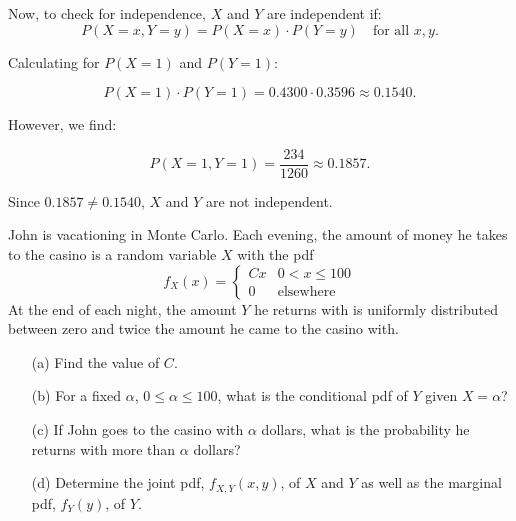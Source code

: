 \begin{solution}
Now, to check for independence, \(X\) and \(Y\) are independent if:
\[
P(X = x, Y = y) = P(X = x) \cdot P(Y = y) \quad \text{for all } x, y.
\]

Calculating for \(P(X = 1)\) and \(P(Y = 1)\):

\[
P(X = 1) \cdot P(Y = 1) = 0.4300 \cdot 0.3596 \approx 0.1540.
\]

However, we find:

\[
P(X = 1, Y = 1) = \frac{234}{1260} \approx 0.1857.
\]

Since \(0.1857 \neq 0.1540\), \(X\) and \(Y\) are not independent.

\end{solution}

\begin{exercise}
John is vacationing in Monte Carlo. Each evening, the amount of money he takes to the casino is a random variable $X$ with the pdf
\[
f_X(x) = 
\begin{cases} 
C x & 0 < x \leq 100 \\ 
0 & \text{elsewhere} 
\end{cases}
\]
At the end of each night, the amount $Y$ he returns with is uniformly distributed between zero and twice the amount he came to the casino with.

\begin{enumerate}
    \item[(a)] Find the value of $C$.
    \item[(b)] For a fixed $\alpha$, $0 \leq \alpha \leq 100$, what is the conditional pdf of $Y$ given $X = \alpha$?
    \item[(c)] If John goes to the casino with $\alpha$ dollars, what is the probability he returns with more than $\alpha$ dollars?
    \item[(d)] Determine the joint pdf, $f_{X,Y}(x, y)$, of $X$ and $Y$ as well as the marginal pdf, $f_Y(y)$, of $Y$.
\end{enumerate}
\end{exercise}

